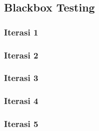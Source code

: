 \begin{landscape}
    \subsection{Blackbox Testing}

    \subsubsection{Iterasi 1}
    
    \newpage
    \subsubsection{Iterasi 2}
    
    \newpage
    
    
    \subsubsection{Iterasi 3}
    
    
    \newpage
    
    
    
    \newpage
    \subsubsection{Iterasi 4}
    
    \newpage
    
    \newpage
    \subsubsection{Iterasi 5}
    

\end{landscape}


